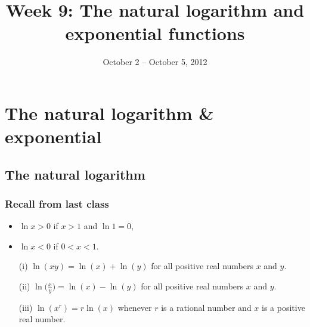 \documentclass[t]{beamer}
\title{Week 9:  The natural logarithm and exponential functions}
\date{October 2 -- October 5, 2012}
\theoremstyle{plain}
\theoremstyle{definition}
\newtheorem{dfn}{Definition}
\newcommand{\ds}{\displaystyle}
\begin{document}
\frame{\titlepage}

\setcounter{tocdepth}{2}


\section{The natural logarithm \& exponential}
\subsection{The natural logarithm}

\begin{frame}
\frametitle{Recall from last class}
\begin{itemize}[<+->]
\item $\ln x>0$ if $x>1$ and $\ln1=0$,
\item $\ln x<0$ if $0<x<1$.
\end{itemize}
\begin{enumerate}[<+->]
\item[(i)] $\ln(xy)=\ln(x)+\ln(y)$ for all positive real numbers $x$ and $y$.
\item[(ii)] $\ds \ln\big(\tfrac{x}{y}\big)=\ln(x)-\ln(y)$ for all positive real numbers $x$ and $y$.
\item[(iii)] $\ln(x^r)=r\ln(x)$ whenever $r$ is a rational number and $x$ is a positive real number.
\end{enumerate}
\end{frame}
\end{document}

